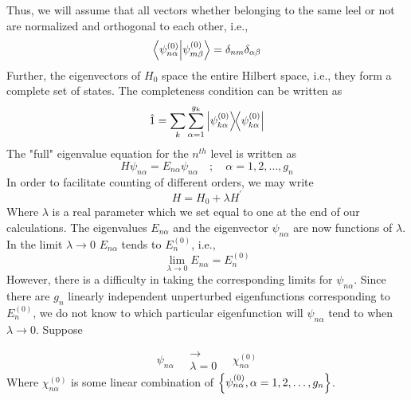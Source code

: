 	Thus, we will assume that all vectors whether belonging to the same leel or not are normalized and orthogonal to each other, i.e.,
	\begin{equation}
		\braket{\psi^{(0)}_{n\alpha}}{\psi^{(0)}_{m\beta}} = \delta_{n m}\delta_{\alpha \beta}
		\label{chapter20.eqn5-degenerate} 
	\end{equation}
	Further, the eigenvectors of $H_0$ space the entire Hilbert space, i.e., they form a complete set of states. The completeness condition can be written as
	\begin{equation}
		\hat{1} = \sum_{k} \sum_{\alpha = 1}^{g_k} \ketbra{\psi^{(0)}_{k\alpha}}{\psi^{(0)}_{k\alpha}}
		\label{chapter20.eqn6-degenerate} 
	\end{equation}
	The "full" eigenvalue equation for the $n^{th}$ level is written as
	\begin{equation}
		H \psi_{n \alpha} = E_{n \alpha} \psi_{n \alpha} \quad ; \quad \alpha = 1,2,\ldots,g_n
		\label{chapter20.eqn7-degenerate} 
	\end{equation}
	In order to facilitate counting of different orders, we may write
	\begin{equation}
		H = H_0 + \lambda H^\prime
	\end{equation}
	Where $\lambda$ is a real parameter which we set equal to one at the end of our calculations.
	The eigenvalues $E_{n \alpha}$ and the eigenvector $\psi_{n\alpha}$ are now functions of $\lambda$. In the limit $\lambda \rightarrow 0$ $E_{n\alpha}$ tends to $E_n^{(0)}$, i.e.,
	\begin{equation}
		\lim\limits_{\lambda \rightarrow 0} E_{n\alpha} = E_n^{(0)}
		\label{chapter20.eqn8-degenerate} 
	\end{equation}
	However, there is a difficulty in taking the corresponding limits for $\psi_{n\alpha}$. Since there are $g_n$ linearly independent unperturbed eigenfunctions corresponding to $E_n^{(0)}$, we do not know to which particular eigenfunction will $\psi_{n\alpha}$ tend to when $\lambda \rightarrow 0$. Suppose
	
	\begin{equation}
		\psi_{n\alpha} \quad \substack{\rightarrow \\ \lambda=0} \quad \chi_{n\alpha}^{(0)}
	\end{equation}
	Where $\chi_{n\alpha}^{(0)}$ is some linear combination of $\qty{\psi_{n \alpha}^{(0)}, \alpha=1,2,\ldots,g_n}$.
	

